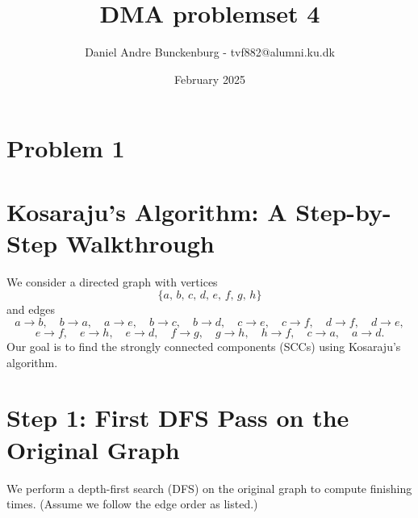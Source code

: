 \documentclass{article}
\title{DMA problemset 4}
\author{Daniel Andre Bunckenburg - tvf882@alumni.ku.dk}
\date{February 2025}
\begin{document}
\maketitle


\section*{Problem 1}



\section*{Kosaraju's Algorithm: A Step-by-Step Walkthrough}

We consider a directed graph with vertices
\[
\{a,\, b,\, c,\, d,\, e,\, f,\, g,\, h\}
\]
and edges
\[
a \to b,\quad b \to a,\quad a \to e,\quad b \to c,\quad b \to d,\quad c \to e,\quad c \to f,\quad d \to f,\quad d \to e,
\]
\[
e \to f,\quad e \to h,\quad e \to d,\quad f \to g,\quad g \to h,\quad h \to f,\quad c \to a,\quad a \to d.
\]
Our goal is to find the strongly connected components (SCCs) using Kosaraju’s algorithm.

\section{Step 1: First DFS Pass on the Original Graph}
We perform a depth-first search (DFS) on the original graph to compute finishing times. (Assume we follow the edge order as listed.)
\end{document}
